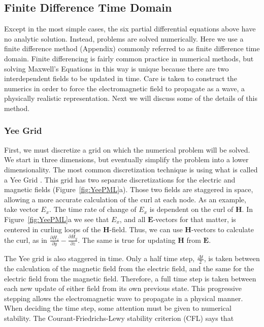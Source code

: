 \documentclass[a4paper]{article}
\begin{document}
\subsection{Finite Difference Time Domain}

Except in the most simple cases, the six partial differential equations above have no analytic solution. Instead, problems are solved numerically. Here we use a finite difference method (Appendix) commonly referred to as finite difference time domain. Finite differencing is fairly common practice in numerical methods, but solving Maxwell's Equations in this way is unique because there are two interdependent fields to be updated in time. Care is taken to construct the numerics in order to force the electromagnetic field to propagate as a wave, a physically realistic representation. Next we will discuss some of the details of this method. 

\subsubsection{Yee Grid}

First, we must discretize a grid on which the numerical problem will be solved. We start in three dimensions, but eventually simplify the problem into a lower dimensionality. The most common discretization technique is using what is called a Yee Grid \citep{Yee1966}. This grid has two separate discretizations for the electric and magnetic fields (Figure~\ref{fig:YeePML}a). Those two fields are staggered in space, allowing a more accurate calculation of the curl at each node. As an
example, take vector $E_x$. The time rate of change of $E_x$ is dependent on the curl of $\textbf{H}$. In Figure~\ref{fig:YeePML}a we see that $E_x$, and all $\textbf{E}$-vectors for that matter, is centered in curling loops of the $\textbf{H}$-field. Thus, we can use $\textbf{H}$-vectors to calculate the curl, as in $\frac{\partial H_z}{\partial y} - \frac{\partial H_y}{\partial z}$. The same is true for updating $\textbf{H}$ from $\textbf{E}$.

The Yee grid is also staggered in time. Only a half time step, $\frac{\Delta t}{2}$, is taken between the calculation of the magnetic field from the electric field, and the same for the electric field from the magnetic field. Therefore, a full time step is taken between each new update of either field from its own previous state. This progressive stepping allows the electromagnetic wave to propagate in a physical manner. When deciding the time step, some attention must be given to numerical stability. The Courant-Friedrichs-Lewy stability criterion (CFL) says that 
\end{document}
